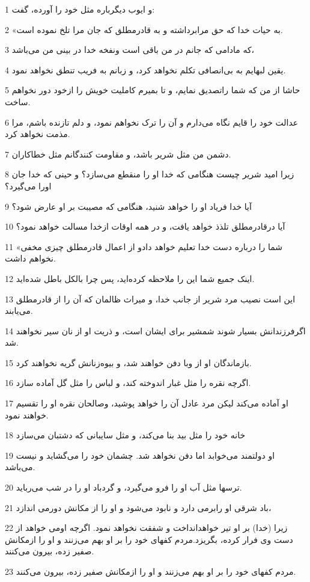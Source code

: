 \par 1 و ایوب دیگرباره مثل خود را آورده، گفت:
\par 2 «به حیات خدا که حق مرابرداشته و به قادرمطلق که جان مرا تلخ نموده است.
\par 3 که مادامی که جانم در من باقی است ونفخه خدا در بینی من می‌باشد،
\par 4 یقین لبهایم به بی‌انصافی تکلم نخواهد کرد، و زبانم به فریب تنطق نخواهد نمود.
\par 5 حاشا از من که شما راتصدیق نمایم، و تا بمیرم کاملیت خویش را ازخود دور نخواهم ساخت.
\par 6 عدالت خود را قایم نگاه می‌دارم و آن را ترک نخواهم نمود، و دلم تازنده باشم، مرا مذمت نخواهد کرد.
\par 7 دشمن من مثل شریر باشد، و مقاومت کنندگانم مثل خطاکاران.
\par 8 زیرا امید شریر چیست هنگامی که خدا او را منقطع می‌سازد؟ و حینی که خدا جان اورا می‌گیرد؟
\par 9 آیا خدا فریاد او را خواهد شنید، هنگامی که مصیبت بر او عارض شود؟
\par 10 آیا درقادرمطلق تلذذ خواهد یافت، و در همه اوقات ازخدا مسالت خواهد نمود؟
\par 11 «شما را درباره دست خدا تعلیم خواهد دادو از اعمال قادرمطلق چیزی مخفی نخواهم داشت.
\par 12 اینک جمیع شما این را ملاحظه کرده‌اید، پس چرا بالکل باطل شده‌اید.
\par 13 این است نصیب مرد شریر از جانب خدا، و میراث ظالمان که آن را از قادرمطلق می‌یابند.
\par 14 اگرفرزندانش بسیار شوند شمشیر برای ایشان است، و ذریت او از نان سیر نخواهند شد.
\par 15 بازماندگان او از وبا دفن خواهند شد، و بیوه‌زنانش گریه نخواهند کرد.
\par 16 اگر‌چه نقره را مثل غبار اندوخته کند، و لباس را مثل گل آماده سازد.
\par 17 او آماده می‌کند لیکن مرد عادل آن را خواهد پوشید، وصالحان نقره او را تقسیم خواهند نمود.
\par 18 خانه خود را مثل بید بنا می‌کند، و مثل سایبانی که دشتبان می‌سازد
\par 19 او دولتمند می‌خوابد اما دفن نخواهد شد. چشمان خود را می‌گشاید و نیست می‌باشد.
\par 20 ترسها مثل آب او را فرو می‌گیرد، و گردباد او را در شب می‌رباید.
\par 21 باد شرقی او رابرمی دارد و نابود می‌شود و او را از مکانش دورمی اندازد،
\par 22 زیرا (خدا) بر او تیر خواهدانداخت و شفقت نخواهد نمود. اگر‌چه اومی خواهد از دست وی فرار کرده، بگریزد.مردم کفهای خود را بر او بهم می‌زنند و او را ازمکانش صفیر زده، بیرون می‌کنند.
\par 23 مردم کفهای خود را بر او بهم می‌زنند و او را ازمکانش صفیر زده، بیرون می‌کنند.
 
